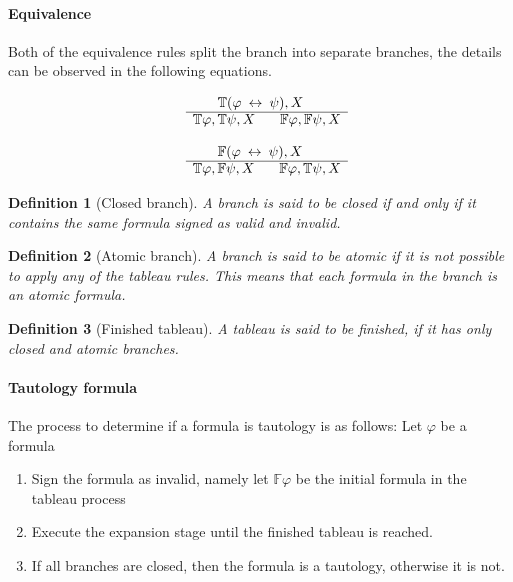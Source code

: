 \documentclass{article}
\newtheorem{defn}{Definition}[section]
\newcommand{\signT}{\mathbb{T}}
\newcommand{\signF}{\mathbb{F}}
\begin{document}
		\paragraph{Equivalence}
Both of the equivalence rules split the branch into separate branches, the details can be observed in the following equations.
		\newline
		\noindent\begin{minipage}{.5\linewidth}
		\begin{align*}
			\begin{array}{rl}
				& \:\:\:\:\:\:\:\: \signT(\varphi \: \leftrightarrow \: \psi), X \\
			      \cline{2-2}
			      & \signT\varphi, \signT\psi, X \:\:\:\:\:\:\:\: \signF\varphi, \signF\psi, X
			\end{array}
		\end{align*}
		\end{minipage}%
		\begin{minipage}{.5\linewidth}
		\begin{align*}
			\begin{array}{rl}
				& \:\:\:\:\:\:\:\: \signF(\varphi \: \leftrightarrow \: \psi), X \\
			      \cline{2-2}
			      & \signT\varphi, \signF\psi, X \:\:\:\:\:\:\:\: \signF\varphi, \signT\psi, X
			\end{array}
		\end{align*}
		\end{minipage}
		\newline
		\begin{defn}[Closed branch]
A branch is said to be closed if and only if it contains the same formula signed as valid and invalid.
		\end{defn}

		\begin{defn}[Atomic branch]
A branch is said to be atomic if it is not possible to apply any of the tableau rules. This means that each formula in the branch is an atomic formula.
		\end{defn}

		\begin{defn}[Finished tableau] 
A tableau is said to be finished, if it has only closed and atomic branches.
		\end{defn}

		\paragraph{Tautology formula} 
The process to determine if a formula is tautology is as follows:
Let $\varphi$ be a formula 
\begin{enumerate}
	\item Sign the formula as invalid, namely let $\signF\varphi$ be the initial formula in the tableau process
	\item Execute the expansion stage until the finished tableau is reached.
	\item If all branches are closed, then the formula is a tautology, otherwise it is not.
\end{enumerate}
\bigskip
\end{document}
